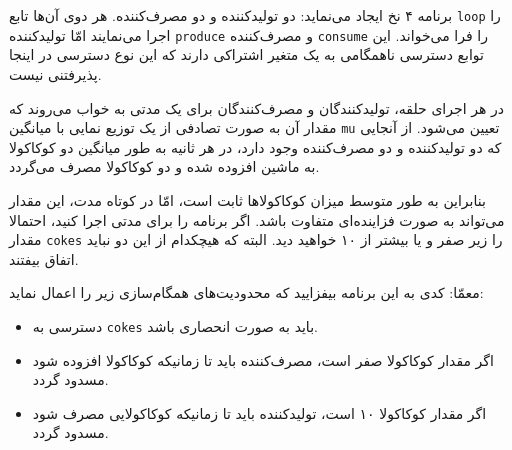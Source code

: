 \documentclass{book}
\begin{document}
    برنامه ۴ نخ ایجاد می‌نماید: دو تولیدکننده و دو مصرف‌کننده. 
    هر دوی آن‌ها تابع {\tt loop} را اجرا می‌نمایند امّا تولیدکننده  {\tt produce}  و مصرف‌کننده {\tt consume} را فرا می‌خواند. 
    این توابع دسترسی ناهمگامی به یک متغیر اشتراکی دارند که این نوع دسترسی در اینجا پذیرفتنی نیست. 

    در هر اجرای حلقه، تولیدکنندگان و مصرف‌کنندگان برای یک مدتی به خواب می‌روند که مقدار آن به صورت تصادفی 
    از یک توزیع نمایی با میانگین  {\tt mu} تعیین می‌شود. از آنجایی که دو تولیدکننده و دو مصرف‌کننده وجود دارد، در هر ثانیه به طور میانگین 
    دو کوکاکولا به ماشین افزوده شده و دو کوکاکولا مصرف می‌گردد. 

    بنابراین به طور متوسط میزان کوکاکولاها ثابت است، امّا در کوتاه مدت، این مقدار می‌تواند به صورت فزاینده‌ای متفاوت باشد.
    اگر برنامه را برای مدتی اجرا کنید، احتمالا مقدار  {\tt cokes}  را زیر صفر و یا بیشتر از ۱۰ خواهید دید. البته که هیچکدام از این دو نباید اتفاق بیفتند. 
    
    معمّا: کدی به این برنامه بیفزایید که محدودیت‌های همگام‌سازی زیر را اعمال نماید:

\begin{itemize}

\item %
    دسترسی به {\tt cokes} باید به صورت انحصاری باشد. 

\item %
    اگر مقدار کوکاکولا صفر است، مصرف‌کننده باید تا زمانیکه کوکاکولا افزوده شود مسدود گردد. 

\item %
    اگر مقدار کوکاکولا ۱۰ است، تولید‌کننده باید تا زمانیکه کوکاکولایی مصرف شود مسدود گردد. 

\end{itemize}
\end{document}
